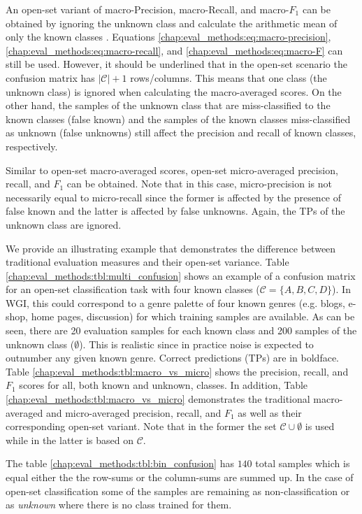 An open-set variant of macro-Precision, macro-Recall, and macro-$F_{1}$ can be obtained by ignoring the unknown class and calculate the arithmetic mean of only the known classes \parencite{mendesjunior2016}. Equations \ref{chap:eval_methods:eq:macro-precision}, \ref{chap:eval_methods:eq:macro-recall}, and \ref{chap:eval_methods:eq:macro-F} can still be used. However, it should be underlined that in the open-set scenario the confusion matrix has $|\mathcal{C}|+1$ rows/columns. This means that one class (the unknown class) is ignored when calculating the macro-averaged scores. On the other hand, the samples of the unknown class that are miss-classified to the known classes (false known) and the samples of the known classes miss-classified as unknown (false unknowns) still affect the precision and recall of known classes, respectively. 

Similar to open-set macro-averaged scores, open-set micro-averaged precision, recall, and $F_{1}$ can be obtained. Note that in this case, micro-precision is not necessarily equal to micro-recall since the former is affected by the presence of false known and the latter is affected by false unknowns. Again, the TPs of the unknown class are ignored. 

We provide an illustrating example that demonstrates the difference between traditional evaluation measures and their open-set variance. Table \ref{chap:eval_methods:tbl:multi_confusion} shows an example of a confusion matrix for an open-set classification task with four known classes ($\mathcal{C}=\{A,B,C,D\}$). In WGI, this could correspond to a genre palette of four known genres (e.g. blogs, e-shop, home pages, discussion) for which training samples are available. As can be seen, there are 20 evaluation samples for each known class and 200 samples of the unknown class ($\emptyset$). This is realistic since in practice noise is expected to outnumber any given known genre. Correct predictions (TPs) are in boldface. Table \ref{chap:eval_methods:tbl:macro_vs_micro} shows the precision, recall, and $F_{1}$ scores for all, both known and unknown, classes. In addition, Table \ref{chap:eval_methods:tbl:macro_vs_micro} demonstrates the traditional macro-averaged and micro-averaged precision, recall, and $F_{1}$ as well as their corresponding open-set variant. Note that in the former the set $\mathcal{C} \cup \emptyset$ is used while in the latter is based on $\mathcal{C}$. 

The table \ref{chap:eval_methods:tbl:bin_confusion} has $140$ total samples which is equal either the the row-sums or the column-sums are summed up. In the case of open-set classification some of the samples are remaining as non-classification or as \textit{unknown} where there is no class trained for them. 

